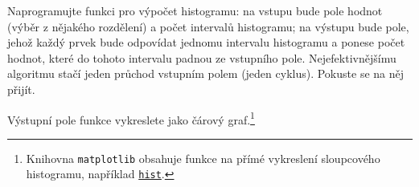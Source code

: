 \documentclass[a4paper,11pt,twoside]{article}
\def\code#1{\textnormal{\texttt{#1}}}
\theoremstyle{red}
\theoremstyle{green}
\begin{document}
    \begin{solved}
        Naprogramujte funkci pro výpočet histogramu: na vstupu bude pole hodnot (výběr z nějakého rozdělení) a počet intervalů histogramu; na výstupu bude pole, jehož každý prvek bude odpovídat jednomu intervalu histogramu a ponese počet hodnot, které do tohoto intervalu padnou ze vstupního pole.
        Nejefektivnějšímu algoritmu stačí jeden průchod vstupním polem (jeden cyklus). 
        Pokuste se na něj přijít.

        Výstupní pole funkce vykreslete jako čárový graf.\footnote{
            Knihovna \code{matplotlib} obsahuje funkce na přímé vykreslení sloupcového histogramu, například \code{\href{https://matplotlib.org/stable/api/_as_gen/matplotlib.pyplot.hist.html}{hist}}.
        }
    \end{solved}
\end{document}

